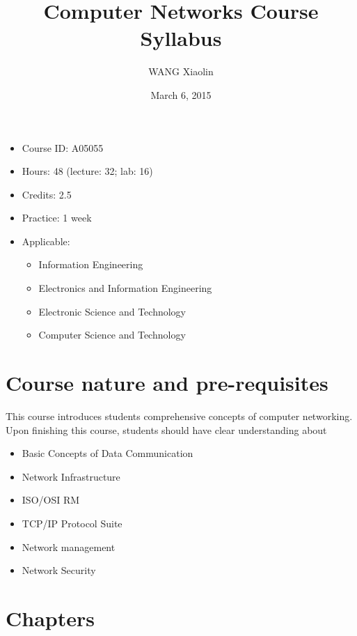 \documentclass{wx672article}
\title{Computer Networks Course Syllabus}
\author{WANG Xiaolin}
\date{March 6, 2015}
\begin{document}
\maketitle


\begin{itemize}
\item Course ID: A05055
\item Hours: 48 (lecture: 32; lab: 16)
\item Credits: 2.5
\item Practice: 1 week
\item Applicable:
\begin{itemize}
\item Information Engineering
\item Electronics and Information Engineering
\item Electronic Science and Technology
\item Computer Science and Technology
\end{itemize}
\end{itemize}


\section*{Course nature and pre-requisites}
\label{sec-1}

   This course introduces students comprehensive concepts of computer
   networking. Upon finishing this course, students should have clear
   understanding about
\begin{itemize}
\item Basic Concepts of Data Communication
\item Network Infrastructure
\item ISO/OSI RM
\item TCP/IP Protocol Suite
\item Network management
\item Network Security
\end{itemize}
\section*{Chapters}
\label{sec-2}
\end{document}
